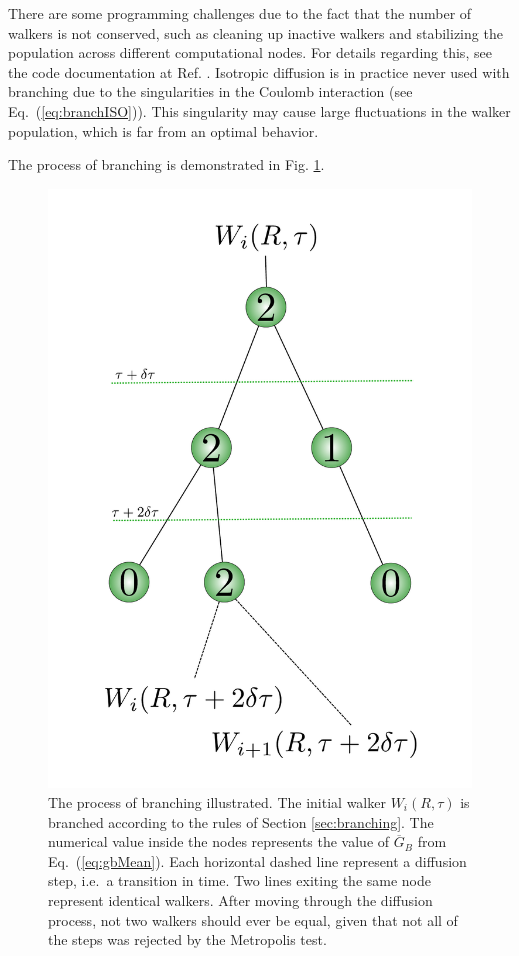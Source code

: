 There are some programming challenges due to the fact that the number of walkers is not conserved, such as cleaning up inactive walkers and stabilizing the population across different computational nodes. For details regarding this, see the code documentation at Ref. \cite{libBorealisCode}. Isotropic diffusion is in practice never used with branching due to the singularities in the Coulomb interaction (see Eq.~(\ref{eq:branchISO})). This singularity may cause large fluctuations in the walker population, which is far from an optimal behavior.

The process of branching is demonstrated in Fig. \ref{fig:branching}.

\begin{figure}
 \begin{center}
  \includegraphics[scale=0.5]{../Graphics/branching.pdf}
  \caption{The process of branching illustrated. The initial walker $W_i(R, \tau)$ is branched according to the rules of Section \ref{sec:branching}. The numerical value inside the nodes represents the value of $\overline{G}_B$ from Eq.~(\ref{eq:gbMean}). Each horizontal dashed line represent a diffusion step, i.e.~a transition in time. Two lines exiting the same node represent identical walkers. After moving through the diffusion process, not two walkers should ever be equal, given that not all of the steps was rejected by the Metropolis test.}
  \label{fig:branching}
 \end{center}
\end{figure}
\clearpage

